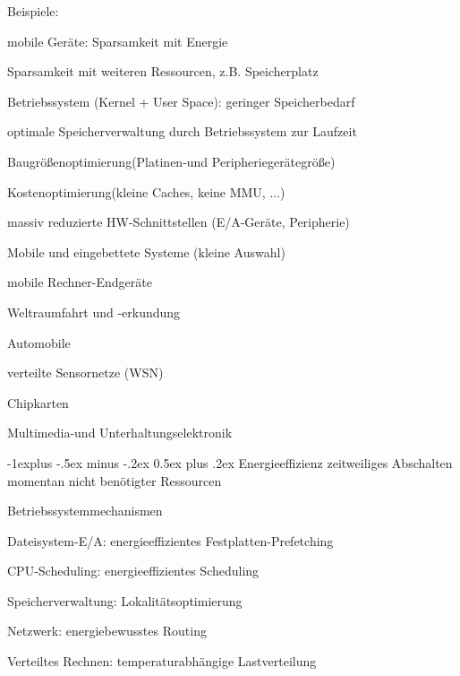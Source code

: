 \documentclass[a4paper]{article}
\makeatletter
\renewcommand{\subsection}{\@startsection{subsection}{2}{0mm}%
 {-1explus -.5ex minus -.2ex}%
 {0.5ex plus .2ex}%
 {\normalfont\normalsize\bfseries}}
\makeatother
\begin{document}
\begin{multicols}{3}
    Beispiele:
    \begin{itemize*}
        \item mobile Geräte: Sparsamkeit mit Energie
        \item Sparsamkeit mit weiteren Ressourcen, z.B. Speicherplatz
        \item Betriebssystem (Kernel + User Space): geringer Speicherbedarf
        \item optimale Speicherverwaltung durch Betriebssystem zur Laufzeit
        \item Baugrößenoptimierung(Platinen-und Peripheriegerätegröße)
        \item Kostenoptimierung(kleine Caches, keine MMU, ...)
        \item massiv reduzierte HW-Schnittstellen (E/A-Geräte, Peripherie)
    \end{itemize*}

    Mobile und eingebettete Systeme (kleine Auswahl)
    \begin{itemize*}
        \item mobile Rechner-Endgeräte
        \item Weltraumfahrt und -erkundung
        \item Automobile
        \item verteilte Sensornetze (WSN)
        \item Chipkarten
        \item Multimedia-und Unterhaltungselektronik
    \end{itemize*}

    \subsection{Energieeffizienz}
    zeitweiliges Abschalten momentan nicht benötigter Ressourcen

    Betriebssystemmechanismen
    \begin{enumerate*}
        \item Dateisystem-E/A: energieeffizientes Festplatten-Prefetching
        \item CPU-Scheduling: energieeffizientes Scheduling
        \item Speicherverwaltung: Lokalitätsoptimierung
        \item Netzwerk: energiebewusstes Routing
        \item Verteiltes Rechnen: temperaturabhängige Lastverteilung
    \end{enumerate*}


\end{multicols}
\end{document}
